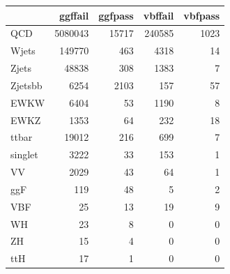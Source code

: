 \begin{tabular}{lrrrr}
\toprule
 & ggffail & ggfpass & vbffail & vbfpass \\
\midrule
QCD & 5080043 & 15717 & 240585 & 1023 \\
Wjets & 149770 & 463 & 4318 & 14 \\
Zjets & 48838 & 308 & 1383 & 7 \\
Zjetsbb & 6254 & 2103 & 157 & 57 \\
EWKW & 6404 & 53 & 1190 & 8 \\
EWKZ & 1353 & 64 & 232 & 18 \\
ttbar & 19012 & 216 & 699 & 7 \\
singlet & 3222 & 33 & 153 & 1 \\
VV & 2029 & 43 & 64 & 1 \\
ggF & 119 & 48 & 5 & 2 \\
VBF & 25 & 13 & 19 & 9 \\
WH & 23 & 8 & 0 & 0 \\
ZH & 15 & 4 & 0 & 0 \\
ttH & 17 & 1 & 0 & 0 \\
\bottomrule
\end{tabular}
